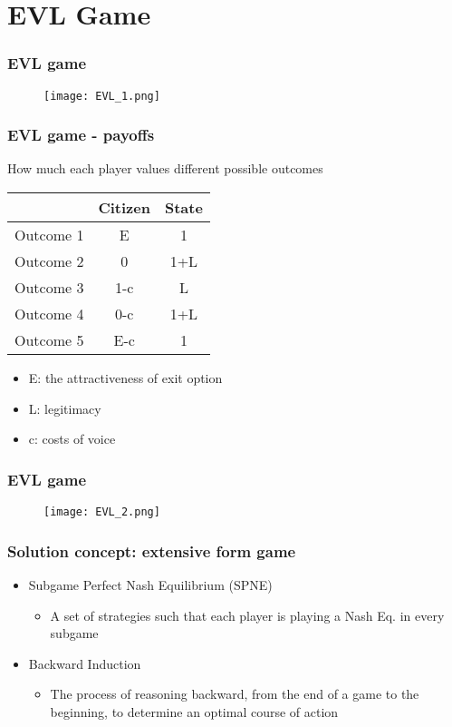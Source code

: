 \documentclass[xcolor=pdftex,dvipsnames]{beamer}
\begin{document}
\section{EVL Game}

\begin{frame}
\frametitle{EVL game}
\begin{figure}
\begin{center}
  \texttt{[image: EVL\_1.png]}\\
\end{center}
\end{figure}
\end{frame}

\begin{frame}
\frametitle{EVL game - payoffs}
How much each player values different possible outcomes \\

\begin{tabular}{c c c}
\hline \hline
                  &  Citizen & State \\ 
\hline
Outcome 1 & E & 1 \\ 
Outcome 2 & 0 & 1+L     \\
Outcome 3 & 1-c  & L        \\
Outcome 4 & 0-c & 1+L \\
Outcome 5 & E-c & 1 \\
\hline 
\end{tabular}

\begin{itemize}
\item E: the attractiveness of exit option
\item L: legitimacy
\item c: costs of voice 
\end{itemize}  
\end{frame}

\begin{frame}
\frametitle{EVL game}
\begin{figure}
\begin{center}
  \texttt{[image: EVL\_2.png]}\\
\end{center}
\end{figure}
\end{frame}

\begin{frame}
\frametitle{Solution concept: extensive form game}
\begin{itemize}
\item Subgame Perfect Nash Equilibrium (SPNE)
\begin{itemize}
\item A set of strategies such that each player is playing a Nash Eq. in every subgame
\end{itemize}
\item Backward Induction
\begin{itemize}
\item The process of reasoning backward, from the end of a game to the beginning, to determine an optimal course of action
\end{itemize}
\end{itemize}
\end{frame}
\end{document}
